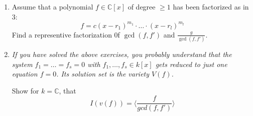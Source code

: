 \begin{exercise}[title = Exercise 1.5.11]
\begin{enumerate}
\begin{addmargin}[0.6cm]{0.6cm}
\begin{center}
            \textit{\textcolor{airforceblue}{If $f = \sum_{j = 0}^{\infty} c_j x^j $}, then $f'$ is defined by $f' = \sum_{j = 1}^{\infty} j \cdot c_j x^{j-1}.$}
    \end{center} 
  \end{addmargin} 
    Show 
    \begin{align*}
      (f + g)' & f' + g' \\ 
      (f \cdot g)' & f' \cdot g + f \cdot g' 
    \end{align*}

    \item Assume that a polynomial $f \in \mathbb{C}[x]$ of degree $\geq 1$ has been factorized as in 3: \[f = c(x-r_1)^{m_1} \cdot \ldots \cdot (x - r_l)^{m_l}\]
    Find a representive factorization 0f $\gcd(f, f')$ and $\frac{g}{\gcd(f, f')}$.  

    \item 
    \begin{center}
            \textit{\textcolor{airforceblue}{If you have solved the above exercises, you probably understand that the system $f_1= \ldots = f_s = 0$ with 
            $f_1, \ldots, f_s \in k[x]$ gets reduced to just one equation $f = 0$. Its solution set is the variety $V(f)$.}}  \\
     \end{center} 
     Show for $k = \mathbb{C}$, that \[I(v(f)) = \langle \frac{f}{gcd(f, f')} \rangle\]
  \end{enumerate} 
\end{exercise}